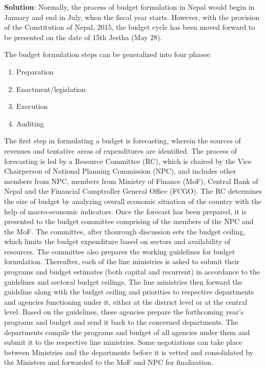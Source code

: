 \documentclass[
  openany]{book}
\newenvironment{solution}{ {\bfseries Solution}:}{}
\begin{document}
\begin{questions}
\begin{solution}
Normally, the process of budget formulation in Nepal would begin in January and end in July, when the fiscal year starts. However, with the provision of the Constitution of Nepal, 2015, the budget cycle has been moved forward to be presented on the date of 15th Jestha (May 28).

The budget formulation steps can be generalized into four phases:
\begin{enumerate}
\item Preparation
\item Enactment/legislation
\item Execution
\item Auditing
\end{enumerate}

The first step in formulating a budget is forecasting, wherein the sources of revenues and tentative areas of expenditures are identified. The process of forecasting is led by a Resource Committee (RC), which is chaired by the Vice Chairperson of National Planning Commission (NPC), and includes other members from NPC, members from Ministry of Finance (MoF), Central Bank of Nepal and the Financial Comptroller General Office (FCGO). The RC determines the size of budget by analyzing overall economic situation of the country with the help of macro-economic indicators. Once the forecast has been prepared, it is presented to the budget committee comprising of the members of the NPC and the MoF. The committee, after thourough discussion sets the budget ceiling, which limits the budget expenditure based on sectors and availability of resources. The committee also prepares the working guidelines for budget formulation. Thereafter, each of the line ministries is asked to submit their programs and budget estimates (both capital and recurrent) in accordance to the guidelines and sectoral budget ceilings. The line ministries then forward the guideline along with the budget ceiling and priorities to respective departments and agencies functioning under it, either at the district level or at the central level. Based on the guidelines, these agencies prepare the forthcoming year's programs and budget and send it back to the concerned departments. The departments compile the programs and budget of all agencies under them and submit it to the respective line ministries. Some negotiations can take place between Ministries and the departments before it is vetted and consolidated by the Ministers and forwarded to the MoF and NPC for finalization.


\end{solution}
\end{questions}
\end{document}
